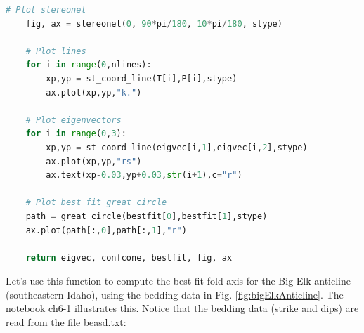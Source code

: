 \documentclass[a4paper , 12pt]{book}
\begin{document}
\begin{center}
\begin{lstlisting}[language=Python, frame=single]
	# Plot stereonet
	fig, ax = stereonet(0, 90*pi/180, 10*pi/180, stype)
	
	# Plot lines
	for i in range(0,nlines):
		xp,yp = st_coord_line(T[i],P[i],stype)
		ax.plot(xp,yp,"k.")
	
	# Plot eigenvectors
	for i in range(0,3):
		xp,yp = st_coord_line(eigvec[i,1],eigvec[i,2],stype)
		ax.plot(xp,yp,"rs")
		ax.text(xp-0.03,yp+0.03,str(i+1),c="r")
	
	# Plot best fit great circle
	path = great_circle(bestfit[0],bestfit[1],stype)
	ax.plot(path[:,0],path[:,1],"r")
	
	return eigvec, confcone, bestfit, fig, ax
\end{lstlisting}
\end{center}

Let's use this function to compute the best-fit fold axis for the Big Elk anticline (southeastern Idaho), using the bedding data in Fig. \ref{fig:bigElkAnticline}. The notebook \href{https://github.com/nfcd/compGeo/blob/master/source/notebooks/ch6-1.ipynb}{ch6-1} illustrates this. Notice that the bedding data (strike and dips) are read from the file \href{https://github.com/nfcd/compGeo/blob/master/source/data/ch6-1/beasd.txt}{beasd.txt}:
\end{document}
